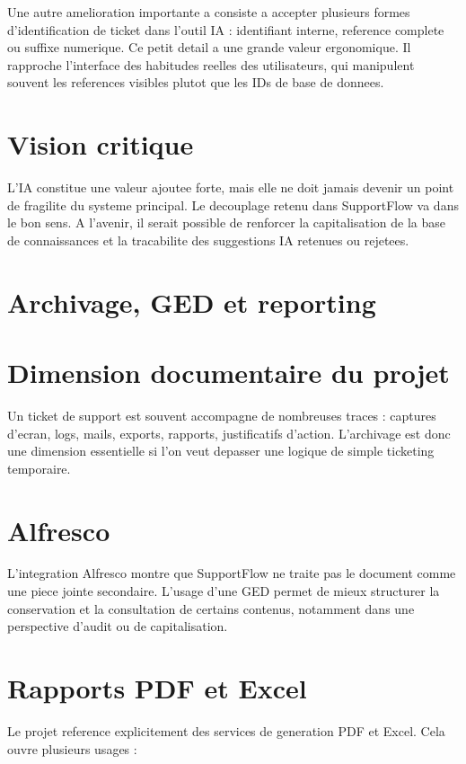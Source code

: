 Une autre amelioration importante a consiste a accepter plusieurs formes d'identification de ticket dans l'outil IA : identifiant interne, reference complete ou suffixe numerique. Ce petit detail a une grande valeur ergonomique. Il rapproche l'interface des habitudes reelles des utilisateurs, qui manipulent souvent les references visibles plutot que les IDs de base de donnees.

\section{Vision critique}

L'IA constitue une valeur ajoutee forte, mais elle ne doit jamais devenir un point de fragilite du systeme principal. Le decouplage retenu dans SupportFlow va dans le bon sens. A l'avenir, il serait possible de renforcer la capitalisation de la base de connaissances et la tracabilite des suggestions IA retenues ou rejetees.



\section{Archivage, GED et reporting}

\section{Dimension documentaire du projet}

Un ticket de support est souvent accompagne de nombreuses traces : captures d'ecran, logs, mails, exports, rapports, justificatifs d'action. L'archivage est donc une dimension essentielle si l'on veut depasser une logique de simple ticketing temporaire.

\section{Alfresco}

L'integration Alfresco montre que SupportFlow ne traite pas le document comme une piece jointe secondaire. L'usage d'une GED permet de mieux structurer la conservation et la consultation de certains contenus, notamment dans une perspective d'audit ou de capitalisation.

\section{Rapports PDF et Excel}

Le projet reference explicitement des services de generation PDF et Excel. Cela ouvre plusieurs usages :

